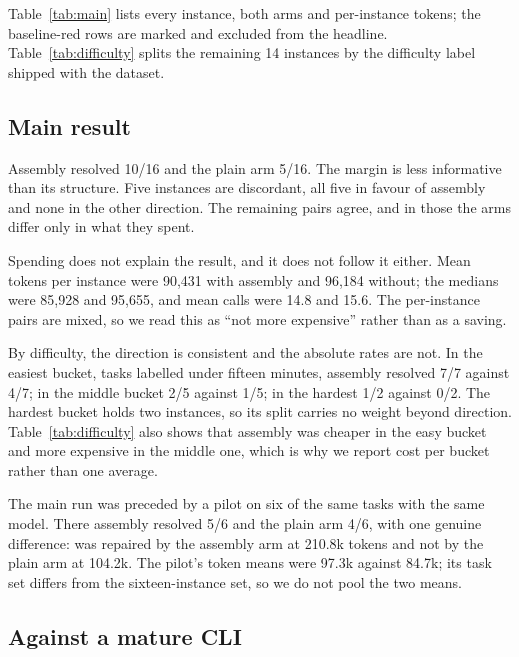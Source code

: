 Table~\ref{tab:main} lists every instance, both arms and per-instance tokens; the baseline-red rows are marked and excluded from the headline. Table~\ref{tab:difficulty} splits the remaining 14 instances by the difficulty label shipped with the dataset.

\subsection{Main result}

Assembly resolved 10/16 and the plain arm 5/16. The margin is less informative than its structure. Five instances are discordant, all five in favour of assembly and none in the other direction. The remaining pairs agree, and in those the arms differ only in what they spent.

Spending does not explain the result, and it does not follow it either. Mean tokens per instance were 90,431 with assembly and 96,184 without; the medians were 85,928 and 95,655, and mean calls were 14.8 and 15.6. The per-instance pairs are mixed, so we read this as ``not more expensive'' rather than as a saving.

By difficulty, the direction is consistent and the absolute rates are not. In the easiest bucket, tasks labelled under fifteen minutes, assembly resolved 7/7 against 4/7; in the middle bucket 2/5 against 1/5; in the hardest 1/2 against 0/2. The hardest bucket holds two instances, so its split carries no weight beyond direction. Table~\ref{tab:difficulty} also shows that assembly was cheaper in the easy bucket and more expensive in the middle one, which is why we report cost per bucket rather than one average.

The main run was preceded by a pilot on six of the same tasks with the same model. There assembly resolved 5/6 and the plain arm 4/6, with one genuine difference:  was repaired by the assembly arm at 210.8k tokens and not by the plain arm at 104.2k. The pilot's token means were 97.3k against 84.7k; its task set differs from the sixteen-instance set, so we do not pool the two means.




\subsection{Against a mature CLI}

